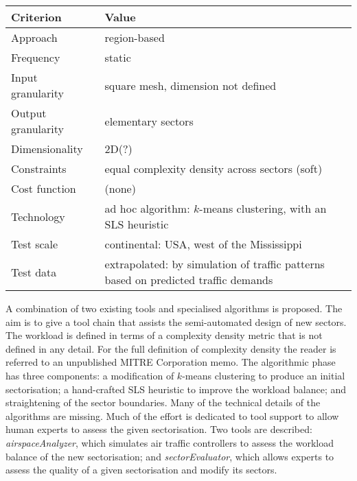 \documentclass[a4paper,12pt]{article}
\begin{document}
\begin{center}
\begin{tabular}{|l|l|}
  \hline
  Criterion & Value \\
  \hline\hline
  Approach & region-based \\ \hline
  Frequency & static \\ \hline
  Input granularity & square mesh, dimension not defined \\ \hline
  Output granularity & elementary sectors \\ \hline
  Dimensionality & 2D(?) \\ \hline
  Constraints & equal complexity density across sectors (soft) \\ \hline
  Cost function & (none) \\ \hline
  Technology & ad hoc algorithm: $k$-means clustering, with an SLS heuristic \\ \hline
  Test scale & continental: USA, west of the Mississippi \\ \hline
  Test data & \parbox{11.5cm}{extrapolated: by simulation of traffic
    patterns based on predicted traffic demands} \\ \hline
\end{tabular}
\end{center}
A combination of two existing tools
\cite{bhadra2005future,wanke2004progressive} and specialised
algorithms is proposed.  The aim is to give a tool chain that assists
the semi-automated design of new sectors.  The workload is defined in
terms of a complexity density metric that is not defined in any
detail.  For the full definition of complexity density the reader is
referred to an unpublished MITRE Corporation memo.  The algorithmic
phase has three components: a modification of $k$-means clustering
\cite{lloyd:k-means:1982} to produce an initial sectorisation; a
hand-crafted SLS heuristic to improve the workload balance; and
straightening of the sector boundaries.  Many of the technical details
of the algorithms are missing.  Much of the effort is dedicated to
tool support to allow human experts to assess the given sectorisation.
Two tools are described: \emph{airspaceAnalyzer}, which simulates air
traffic controllers to assess the workload balance of the new
sectorisation; and \emph{sectorEvaluator}, which allows experts to
assess the quality of a given sectorisation and modify its sectors.

\subsection{\cite{Martinez:GNC07}}
\end{document}
